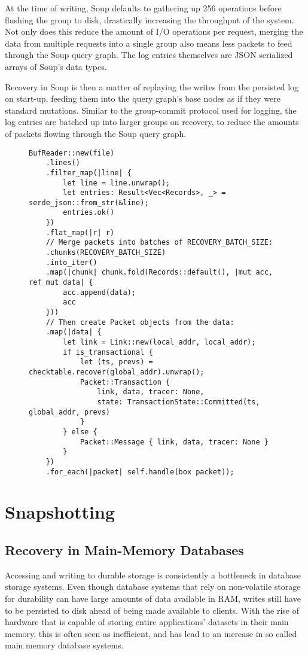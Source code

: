 \documentclass[b5paper]{report}
\begin{document}
At the time of writing, Soup defaults to gathering up 256 operations before
flushing the group to disk, drastically increasing the throughput of the system.
Not only does this reduce the amount of I/O operations per request, merging the
data from multiple requests into a single group also means less packets to feed
through the Soup query graph. The log entries themselves are JSON \cite{json}
serialized arrays of Soup's data types.

Recovery in Soup is then a matter of replaying the writes from the persisted log
on start-up, feeding them into the query graph's base nodes as if they were
standard mutations. Similar to the group-commit protocol used for logging, the
log entries are batched up into larger groups on recovery, to reduce the amounts
of packets flowing through the Soup query graph.

\begin{figure}
\begin{lstlisting}[caption="Recovering from the Soup log"]
BufReader::new(file)
    .lines()
    .filter_map(|line| {
        let line = line.unwrap();
        let entries: Result<Vec<Records>, _> = serde_json::from_str(&line);
        entries.ok()
    })
    .flat_map(|r| r)
    // Merge packets into batches of RECOVERY_BATCH_SIZE:
    .chunks(RECOVERY_BATCH_SIZE)
    .into_iter()
    .map(|chunk| chunk.fold(Records::default(), |mut acc, ref mut data| {
        acc.append(data);
        acc
    }))
    // Then create Packet objects from the data:
    .map(|data| {
        let link = Link::new(local_addr, local_addr);
        if is_transactional {
            let (ts, prevs) = checktable.recover(global_addr).unwrap();
            Packet::Transaction {
                link, data, tracer: None,
                state: TransactionState::Committed(ts, global_addr, prevs)
            }
        } else {
            Packet::Message { link, data, tracer: None }
        }
    })
    .for_each(|packet| self.handle(box packet));
\end{lstlisting}
\end{figure}

\chapter{Snapshotting}
\section{Recovery in Main-Memory Databases}
Accessing and writing to durable storage is consistently a bottleneck in
database storage systems. Even though database systems that rely on non-volatile
storage for durability can have large amounts of data available in RAM, writes
still have to be persisted to disk ahead of being made available to clients.
With the rise of hardware that is capable of storing entire applications'
datasets in their main memory, this is often seen as inefficient, and has lead
to an increase in so called main memory database systems.
\end{document}
